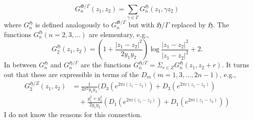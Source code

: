 $$
G^{\mathfrak{G}/\Gamma}_{n}(z_{1},z_{2})=\sum\limits_{\gamma\in \Gamma}G^{\mathfrak{H}}_{n}(z_{1},\gamma z_{2})
$$
where $G^{\mathfrak{H}}_{n}$ is defined analogously to $G^{\mathfrak{G}/\Gamma}_{n}$ but with $\mathfrak{H}/\Gamma$ replaced by $\mathfrak{H}$. The functions $G^{\mathfrak{H}}_{n}(n=2,3,\ldots)$ are elementary, e.g.,
$$
G^{\mathfrak{H}}_{2}(z_{1},z_{2})=\left(1+\frac{|z_{1}-z_{2}|^{2}}{2y_{1}y_{2}}\right)\log \frac{|z_{1}-z_{2}|^{2}}{|z_{1}-\overline{z}_{2}|^{2}}+2.
$$
In between $G^{\mathfrak{H}}_{n}$ and $G^{\mathfrak{H}/\Gamma}_{n}$ are the functions $G^{\mathfrak{H}/\Gamma}_{n}=\Sigma_{r\in Z}G^{\mathfrak{H}}_{n}(z_{1},z_{2}+r)$. It turns out \cite{art15-key10} that these are expressible in terms of the $D_{m}(m=1,3,\ldots,2n-1)$, e.g.,
\begin{align*}
G^{\mathfrak{H}/Z}_{2}(z_{1},z_{2}) &= \frac{1}{4\pi^{2}y_{1}y_{2}}(D_{3}(e^{2\pi i(z_{1}-z_{2})})+D_{3}(e^{2\pi i(z_{1}-\overline{z}_{2})})\\
&\quad +\frac{y^{2}_{1}+y^{2}_{2}}{2y_{1}y_{2}}(D_{1}(e^{2\pi i(z_{1}-z_{2})})+D_{1}(e^{2\pi i(z_{1}-\overline{z}_{2})}))
\end{align*}
I do not know the reasons for this connection.

